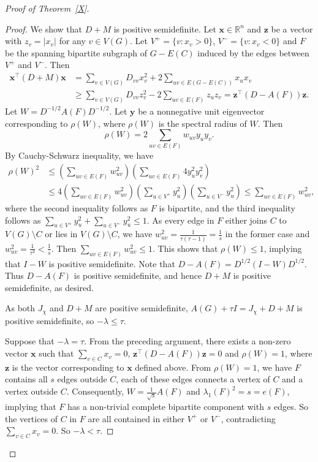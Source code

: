\documentclass[10pt,a4paper]{amsart}
\begin{document}
\begin{proof}[Proof of Theorem~\ref{X}]
\begin{proof}
We show that $D+M$ is positive semidefinite.
Let $\mathbf{x}\in  \mathbb{R}^{n}$ and $\mathbf{z}$ be a vector with $z_v=|x_v|$ for any $v\in V(G)$. Let $V^+ = \{v : x_v > 0\}$, $V^- = \{v : x_v < 0\}$ and $F$ be the spanning bipartite subgraph of $G-E(C)$ induced by the edges between $V^+$ and $V^-$.
Then \begin{align*}
\mathbf{x}^\top (D+M)\mathbf{x}&=\sum_{v\in V(G)}D_{vv}x_v^2+2\sum_{uv\in E(G-E(C))}x_ux_v\\
&\ge \sum_{v\in V(G)}D_{vv}z_v^2-2\sum_{uv\in E(F)}z_uz_v=\mathbf{z}^\top (D-A(F))\mathbf{z}.
\end{align*}
Let $W = D^{-1/2}A(F)D^{-1/2}$.
Let $\mathbf{y}$ be a nonnegative unit eigenvector corresponding to $\rho(W)$, where $\rho(W)$ is the spectral radius of $W$. Then \[
\rho(W)=2\sum_{uv\in E(F)}w_{uv}y_uy_v.
\]
By Cauchy-Schwarz inequality, we have \begin{align*}
\rho(W)^2 &\le \left(\sum_{uv\in E(F)}w_{uv}^2\right)\left( \sum_{uv\in E(F)}4y_u^2y_v^2\right)\\
&\le 4\left(\sum_{uv\in E(F)}w_{uv}^2\right)\left(\sum_{u\in V^+}y_u^2\right)\left(\sum_{u\in V^-}y_u^2\right)\le \sum_{uv\in E(F)}w_{uv}^2,
\end{align*}
where the second inequality follows as $F$ is bipartite, and the third inequality follows as $\sum_{u\in V^+}y_u^2+\sum_{u\in V^-}y_u^2\le 1$.
As every edge in $F$ either joins $C$ to $V(G)\setminus C$ or lies in $V(G)\setminus C$, we have $w_{uv}^2=\frac{1}{\tau(\tau-1)}=\frac{1}{s}$ in the former case and $w_{uv}^2=\frac{1}{\tau^2}<\frac{1}{s}$. Then $\sum_{uv\in E(F)}w_{uv}^2\le 1$. This shows that $\rho(W)\le 1$, implying that $I-W$ is positive semidefinite.
Note that $D-A(F)=D^{1/2}(I-W)D^{1/2}$. Thus $D-A(F)$ is positive semidefinite, and hence $D+M$ is positive semidefinite, as desired. 

As both  $J_{\chi}$ and $D+M$ are positive semidefinite, 
 $A(G)+\tau I=J_{\chi}+D+M$ is positive semidefinite, so  $-\lambda\le \tau$. 

Suppose that $-\lambda=\tau$. From the preceding argument, there exists a non-zero vector $\mathbf{x}$ such that $\sum_{v\in C}x_v=0$, $\mathbf{z}^\top (D-A(F))\mathbf{z}=0$ and $\rho(W)=1$, where $\mathbf{z}$ is the vector corresponding to $\mathbf{x}$ defined above. From $\rho(W)=1$, we have $F$ contains all $s$ edges outside $C$, each of these edges connects a vertex of $C$ and a vertex outside $C$. Consequently, $W=\tfrac{1}{\sqrt{s}}A(F)$ and $\lambda_1(F)^2=s=e(F)$, implying that $F$ has a non-trivial complete bipartite component with $s$ edges. So the vertices of $C$ in $F$ are all contained in either $V^+$ or $V^-$, contradicting $\sum_{v\in C}x_v=0$. So $-\lambda<\tau$.
\end{proof}


\end{proof}
\end{document}
